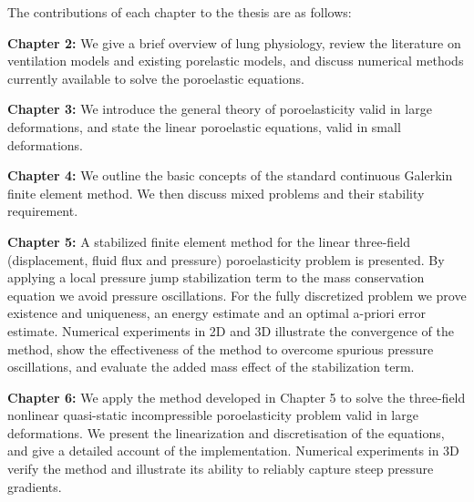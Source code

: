 The contributions of each chapter to the thesis are as follows:\newline

\noindent \textbf{Chapter 2:} We give a brief overview of lung physiology, review the literature on ventilation models and existing porelastic models, and discuss numerical methods currently available to solve the poroelastic equations.\newline

\noindent \textbf{Chapter 3:} We introduce the general theory of poroelasticity valid in large deformations, and state the linear poroelastic equations, valid in small deformations.\newline

\noindent \textbf{Chapter 4:} We
outline the basic concepts of the standard
continuous Galerkin finite element method. We then discuss mixed problems and their stability requirement.
\newline

\noindent \textbf{Chapter 5:} A stabilized finite element method for the linear three-field (displacement, fluid flux and pressure) poroelasticity problem is presented. By applying a local pressure jump stabilization term to the mass conservation equation we avoid pressure oscillations. For the fully discretized problem we prove existence and uniqueness, an energy estimate and an optimal a-priori error estimate. Numerical experiments in 2D and 3D illustrate the convergence of the method, show the effectiveness of the method to overcome spurious pressure oscillations, and evaluate the added mass effect of the stabilization term.
\newline
%

\noindent \textbf{Chapter 6:} We apply the method developed in Chapter 5 to solve the three-field nonlinear quasi-static incompressible poroelasticity problem valid in large deformations. We present the linearization and discretisation of the equations, and give a detailed account of the implementation. Numerical experiments in 3D verify the method and illustrate its ability to reliably capture steep pressure gradients.
\newline


